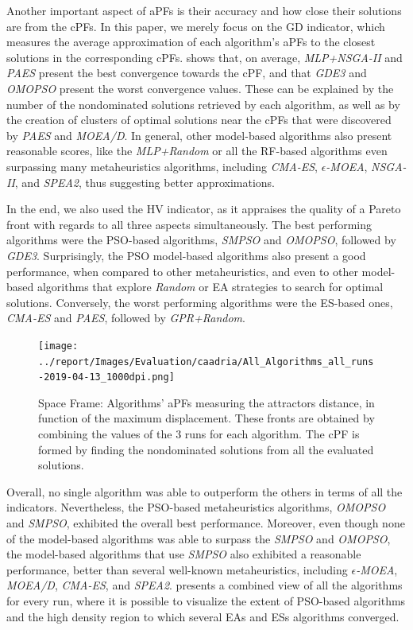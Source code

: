 Another important aspect of \acp{aPF} is their accuracy and how close their solutions are from the \acp{cPF}. In this paper, we merely focus on the \ac{GD} indicator, which measures the average approximation of each algorithm's \acp{aPF} to the closest solutions in the corresponding \acp{cPF}.  shows that, on average, \textit{MLP+NSGA-II} and \textit{PAES} present the best convergence towards the \ac{cPF}, and that \textit{GDE3} and \textit{OMOPSO} present the worst convergence values. These can be explained by the number of the nondominated solutions retrieved by each algorithm, as well as by the creation of clusters of optimal solutions near the \acp{cPF} that were discovered by \textit{PAES} and \textit{MOEA/D}. In general, other model-based algorithms also present reasonable scores, like the \textit{MLP+Random} or all the \ac{RF}-based algorithms even surpassing many metaheuristics algorithms, including \textit{CMA-ES}, $\epsilon$\textit{-MOEA}, \textit{NSGA-II}, and \textit{SPEA2}, thus suggesting better approximations.

In the end, we also used the \ac{HV} indicator, as it appraises the quality of a Pareto front with regards to all three aspects simultaneously. The best performing algorithms were the \ac{PSO}-based algorithms, \textit{SMPSO} and \textit{OMOPSO}, followed by \textit{GDE3}. Surprisingly, the \ac{PSO} model-based algorithms also present a good performance, when compared to other metaheuristics, and even to other model-based algorithms that explore \textit{Random} or \ac{EA} strategies to search for optimal solutions. Conversely, the worst performing algorithms were the \ac{ES}-based ones, \textit{CMA-ES} and \textit{PAES}, followed by \textit{GPR+Random}. 

\begin{figure}[hptb]
	\centering
	\texttt{[image: ../report/Images/Evaluation/caadria/All\_Algorithms\_all\_runs-2019-04-13\_1000dpi.png]}
	\caption[Space Frame: Pareto front plot]{Space Frame: Algorithms' \acp{aPF} measuring the attractors distance, in function of the maximum displacement. These fronts are obtained by combining the values of the $3$ runs for each algorithm. The \ac{cPF} is formed by finding the nondominated solutions from all the evaluated solutions.}
	\label{fig:allruns}
\end{figure}

Overall, no single algorithm was able to outperform the others in terms of all the indicators. Nevertheless, the \ac{PSO}-based metaheuristics algorithms, \textit{OMOPSO} and \textit{SMPSO}, exhibited the overall best performance. Moreover, even though none of the model-based algorithms was able to surpass the \textit{SMPSO} and \textit{OMOPSO}, the model-based algorithms that use \textit{SMPSO} also exhibited a reasonable performance, better than several well-known metaheuristics, including $\epsilon$\textit{-MOEA}, \textit{MOEA/D}, \textit{CMA-ES}, and \textit{SPEA2}.  presents a combined view of all the algorithms for every run, where it is possible to visualize the extent of \ac{PSO}-based algorithms and the high density region to which several \acp{EA} and \acp{ES} algorithms converged.
